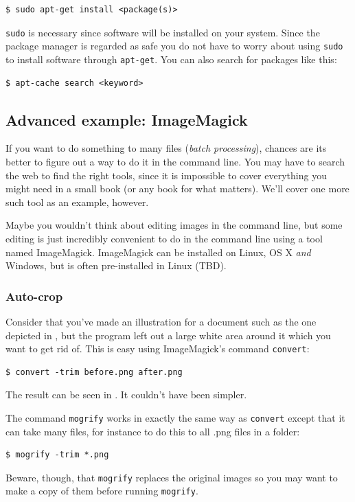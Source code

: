 \begin{verbatim}
$ sudo apt-get install <package(s)>
\end{verbatim}
\verb|sudo| is necessary since software will be installed on your system. Since the package manager is regarded as safe you do not have to worry about using \verb|sudo| to install software through \verb|apt-get|. You can also search for packages like this:

\begin{verbatim}
$ apt-cache search <keyword>
\end{verbatim}

\subsection{Advanced example: ImageMagick}
If you want to do something to many files (\emph{batch processing}), chances are its better to figure out a way to do it in the command line. You may have to search the web to find the right tools, since it is impossible to cover everything you might need in a small book (or any book for what matters). We'll cover one more such tool as an example, however.

Maybe you wouldn't think about editing images in the command line, but some editing is just incredibly convenient to do in the command line using a tool named ImageMagick. ImageMagick can be installed on Linux, OS X \emph{and} Windows, but is often pre-installed in Linux (TBD).

\subsubsection{Auto-crop}
Consider that you've made an illustration for a document such as the one depicted in , but the program left out a large white area around it which you want to get rid of. This is easy using ImageMagick's command \verb|convert|:

\begin{verbatim}
$ convert -trim before.png after.png
\end{verbatim}
The result can be seen in . It couldn't have been simpler.

The command \verb|mogrify| works in exactly the same way as \verb|convert| except that it can take many files, for instance to do this to all .png files in a folder:

\begin{verbatim}
$ mogrify -trim *.png
\end{verbatim}
Beware, though, that \verb|mogrify| replaces the original images so you may want to make a copy of them before running \verb|mogrify|.

